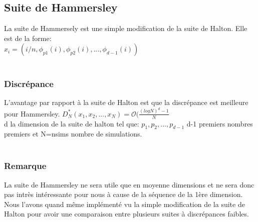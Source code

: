 \documentclass[12pt]{report}
\begin{document}
\subsection{Suite de Hammersley}
La suite de Hammersely est une simple modification de la suite de Halton. Elle est de la forme:\\
$x_i=(i/n,\phi_{p1}(i),\phi_{p2}(i),...,\phi_{d-1}(i))$\\\\


\subsubsection{Discrépance}
L'avantage par rapport à la suite de Halton est que la discrépance est meilleure pour Hammersley.
$D_N^*(x_1,x_2,...,x_N)=\mathcal{O}(\frac{(logN)^d-1}{N} $\\
d la dimension de la suite de halton tel que: $p_1,p_2,...,p_{d-1}$ d-1 premiers nombres premiers et N=nsims nombre de simulations.\\\\

\subsubsection{Remarque}
La suite de Hammersley ne sera utile que en moyenne dimensions et ne sera donc pas intrès intéressante pour nous à cause de la séquence de la 1ère dimension.\\
Nous l'avons quand même implémenté vu la simple modification de la suite de Halton pour avoir une comparaison entre plusieurs suites à discrépances faibles.
\end{document}

